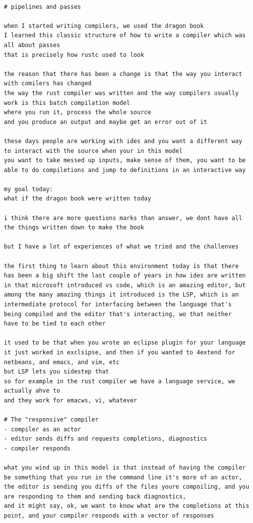 \documentclass[12pt, a4paper]{report}
\begin{document}
\begin{verbatim}

# pipelines and passes

when I started writing compilers, we used the dragon book
I learned this classic structure of how to write a compiler which was
all about passes
that is precisely how rustc used to look

the reason that there has been a change is that the way you interact
with comilers has changed
the way the rust compiler was written and the way compilers usually
work is this batch compilation model
where you run it, process the whole source
and you produce an output and maybe get an error out of it

these days people are working with ides and you want a different way
to interact with the source when your in this model
you want to take messed up inputs, make sense of them, you want to be
able to do compiletions and jump to definitions in an interactive way

my goal today:
what if the dragon book were written today

i think there are more questions marks than answer, we dont have all
the things written down to make the book

but I have a lot of experiences of what we tried and the challenves

the first thing to learn about this environment today is that there
has been a big shift the last couple of years in how ides are written
in that microsoft introduced vs code, which is an amazing editor, but
among the many amazing things it introduced is the LSP, which is an
intermediate protocol for interfacing between the language that's
being compiled and the editor that's interacting, wo that neither
have to be tied to each other

it used to be that when you wrote an eclipse plugin for your language
it just worked in exclsipse, and then if you wanted to 4extend for
netbeans, and emacs, and vim, etc
but LSP lets you sidestep that
so for example in the rust compiler we have a language service, we
actually ahve to
and they work for emacws, vi, whatever

# The "responsive" compiler
- compiler as an actor
- editor sends diffs and requests completions, diagnostics
- compiler responds

what you wind up in this model is that instead of having the compiler
be something that you run in the command line it's more of an actor,
the editor is sending you diffs of the files youre compoiling, and you
are responding to them and sending back diagnostics,
and it might say, ok, we want to know what are the completions at this
point, and your compiler responds with a vector of responses


\end{verbatim}
\end{document}
